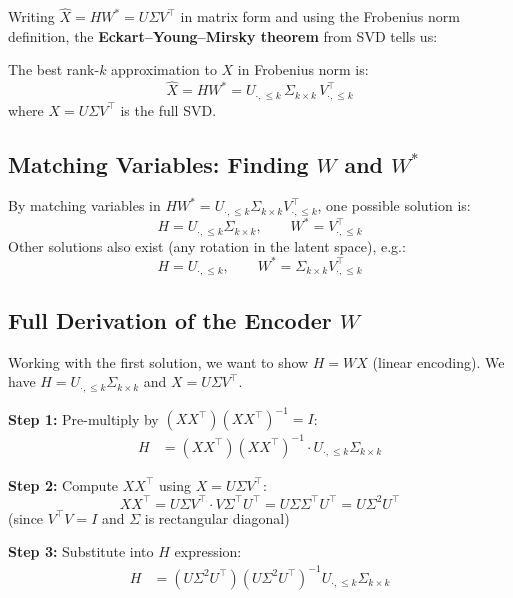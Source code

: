 \documentclass[12pt,a4paper]{article}
\begin{document}
Writing $\hat{X} = HW^* = U\Sigma V^\top$ in matrix form and using the Frobenius norm definition, the \textbf{Eckart--Young--Mirsky theorem} from SVD tells us:

\begin{theorembox}[title={Eckart--Young Theorem}]
The best rank-$k$ approximation to $X$ in Frobenius norm is:
\[
  \hat{X} = HW^* = U_{\cdot,\leq k}\,\Sigma_{k\times k}\,V_{\cdot,\leq k}^\top
\]
where $X = U\Sigma V^\top$ is the full SVD.
\end{theorembox}

\subsection{Matching Variables: Finding $W$ and $W^*$}

By matching variables in $HW^* = U_{\cdot,\leq k}\Sigma_{k\times k}V_{\cdot,\leq k}^\top$, one possible solution is:
\[
  H = U_{\cdot,\leq k}\Sigma_{k\times k},
  \qquad
  W^* = V_{\cdot,\leq k}^\top
\]
Other solutions also exist (any rotation in the latent space), e.g.:
\[
  H = U_{\cdot,\leq k},
  \qquad
  W^* = \Sigma_{k\times k}V_{\cdot,\leq k}^\top
\]

\subsection{Full Derivation of the Encoder $W$}

Working with the first solution, we want to show $H = WX$ (linear encoding). We have $H = U_{\cdot,\leq k}\Sigma_{k\times k}$ and $X = U\Sigma V^\top$.

\textbf{Step 1:} Pre-multiply by $(XX^\top)(XX^\top)^{-1} = I$:
\begin{align*}
  H &= (XX^\top)(XX^\top)^{-1} \cdot U_{\cdot,\leq k}\Sigma_{k\times k}
\end{align*}

\textbf{Step 2:} Compute $XX^\top$ using $X = U\Sigma V^\top$:
\[
  XX^\top = U\Sigma V^\top \cdot V\Sigma^\top U^\top = U\Sigma\Sigma^\top U^\top = U\Sigma^2 U^\top
\]
(since $V^\top V = I$ and $\Sigma$ is rectangular diagonal)

\textbf{Step 3:} Substitute into $H$ expression:
\begin{align*}
  H &= (U\Sigma^2 U^\top)(U\Sigma^2 U^\top)^{-1} U_{\cdot,\leq k}\Sigma_{k\times k}
\end{align*}
\end{document}
